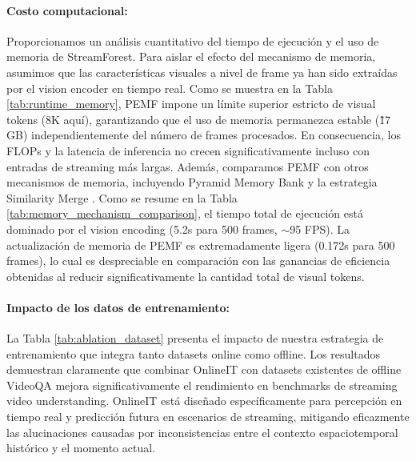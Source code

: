 \paragraph{Costo computacional:} 
Proporcionamos un análisis cuantitativo del tiempo de ejecución y el uso de memoria de StreamForest. Para aislar el efecto del mecanismo de memoria, asumimos que las características visuales a nivel de frame ya han sido extraídas por el vision encoder en tiempo real. Como se muestra en la Tabla \ref{tab:runtime_memory}, PEMF impone un límite superior estricto de visual tokens (8K aquí), garantizando que el uso de memoria permanezca estable (\~17 GB) independientemente del número de frames procesados. En consecuencia, los FLOPs y la latencia de inferencia no crecen significativamente incluso con entradas de streaming más largas.
%
Además, comparamos PEMF con otros mecanismos de memoria, incluyendo Pyramid Memory Bank \cite{huang2024videochatonline} y la estrategia Similarity Merge \cite{song2024moviechat}. Como se resume en la Tabla \ref{tab:memory_mechanism_comparison}, el tiempo total de ejecución está dominado por el vision encoding (5.2s para 500 frames, $\sim$95 FPS). La actualización de memoria de PEMF es extremadamente ligera (0.172s para 500 frames), lo cual es despreciable en comparación con las ganancias de eficiencia obtenidas al reducir significativamente la cantidad total de visual tokens. 



\paragraph{Impacto de los datos de entrenamiento:}
La Tabla \ref{tab:ablation_dataset} presenta el impacto de nuestra estrategia de entrenamiento que integra tanto datasets online como offline. Los resultados demuestran claramente que combinar OnlineIT con datasets existentes de offline VideoQA mejora significativamente el rendimiento en benchmarks de streaming video understanding. OnlineIT está diseñado específicamente para percepción en tiempo real y predicción futura en escenarios de streaming, mitigando eficazmente las alucinaciones causadas por inconsistencias entre el contexto espaciotemporal histórico y el momento actual.






